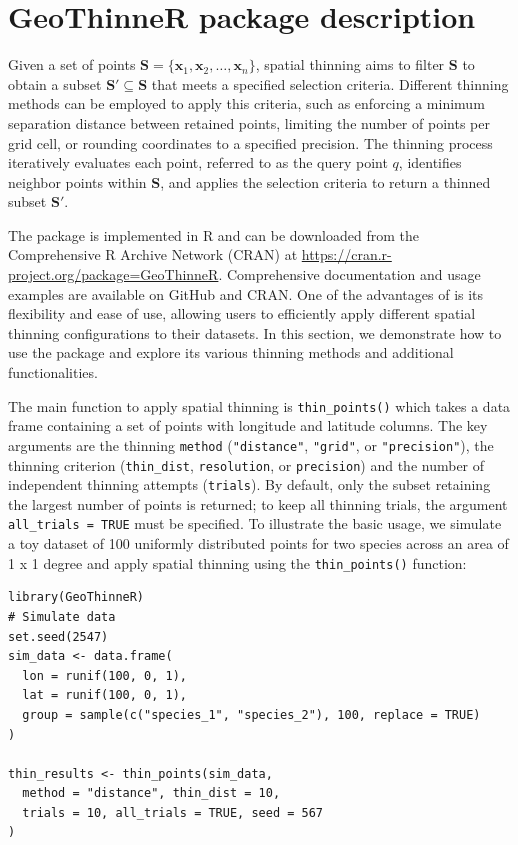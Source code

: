 \section{GeoThinneR package description}\label{packagedescription}

Given a set of points \(\mathbf{S} = \{ \mathbf{x}_1, \mathbf{x}_2, \dots, \mathbf{x}_n \}\), spatial thinning aims to filter \(\mathbf{S}\) to obtain a subset \(\mathbf{S}' \subseteq \mathbf{S}\) that meets a specified selection criteria. Different thinning methods can be employed to apply this criteria, such as enforcing a minimum separation distance between retained points, limiting the number of points per grid cell, or rounding coordinates to a specified precision. The thinning process iteratively evaluates each point, referred to as the query point \(q\), identifies neighbor points within \(\mathbf{S}\), and applies the selection criteria to return a thinned subset \(\mathbf{S}'\).

The  package is implemented in R and can be downloaded from the Comprehensive R Archive Network (CRAN) at \url{https://cran.r-project.org/package=GeoThinneR}. Comprehensive documentation and usage examples are available on GitHub and CRAN. One of the advantages of  is its flexibility and ease of use, allowing users to efficiently apply different spatial thinning configurations to their datasets. In this section, we demonstrate how to use the package and explore its various thinning methods and additional functionalities.

The main function to apply spatial thinning is \texttt{thin\_points()} which takes a data frame containing a set of points with longitude and latitude columns. The key arguments are the thinning \texttt{method} (\texttt{"distance"}, \texttt{"grid"}, or \texttt{"precision"}), the thinning criterion (\texttt{thin\_dist}, \texttt{resolution}, or \texttt{precision}) and the number of independent thinning attempts (\texttt{trials}). By default, only the subset retaining the largest number of points is returned; to keep all thinning trials, the argument \texttt{all\_trials\ =\ TRUE} must be specified. To illustrate the basic usage, we simulate a toy dataset of 100 uniformly distributed points for two species across an area of 1 x 1 degree and apply spatial thinning using the \texttt{thin\_points()} function:

\begin{verbatim}
library(GeoThinneR)
# Simulate data
set.seed(2547)
sim_data <- data.frame(
  lon = runif(100, 0, 1),
  lat = runif(100, 0, 1),
  group = sample(c("species_1", "species_2"), 100, replace = TRUE)
)

thin_results <- thin_points(sim_data,
  method = "distance", thin_dist = 10,
  trials = 10, all_trials = TRUE, seed = 567
)
\end{verbatim}

